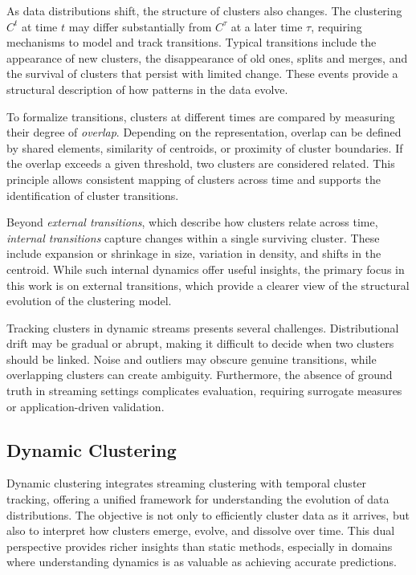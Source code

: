 As data distributions shift, the structure of clusters also changes. The
clustering $C^t$ at time $t$ may differ substantially from $C^\tau$ at a later
time $\tau$, requiring mechanisms to model and track transitions. Typical transitions
include the appearance of new clusters, the disappearance of old ones, splits
and merges, and the survival of clusters that persist with limited change. These
events provide a structural description of how patterns in the data evolve.

To formalize transitions, clusters at different times are compared by measuring
their degree of \emph{overlap}. Depending on the representation, overlap can be defined
by shared elements, similarity of centroids, or proximity of cluster boundaries.
If the overlap exceeds a given threshold, two clusters are considered related.
This principle allows consistent mapping of clusters across time and supports
the identification of cluster transitions.

Beyond \emph{external transitions}, which describe how clusters relate across time,
\emph{internal transitions} capture changes within a single surviving cluster. These
include expansion or shrinkage in size, variation in density, and shifts in the
centroid. While such internal dynamics offer useful insights, the primary focus
in this work is on external transitions, which provide a clearer view of the
structural evolution of the clustering model.

Tracking clusters in dynamic streams presents several challenges. Distributional
drift may be gradual or abrupt, making it difficult to decide when two clusters
should be linked. Noise and outliers may obscure genuine transitions, while
overlapping clusters can create ambiguity. Furthermore, the absence of ground
truth in streaming settings complicates evaluation, requiring surrogate measures
or application-driven validation.

\subsection{Dynamic Clustering}\label{sec:dynamic_clustering}

Dynamic clustering integrates streaming clustering with temporal cluster
tracking, offering a unified framework for understanding the evolution of data
distributions. The objective is not only to efficiently cluster data as it
arrives, but also to interpret how clusters emerge, evolve, and dissolve over
time. This dual perspective provides richer insights than static methods,
especially in domains where understanding dynamics is as valuable as achieving
accurate predictions.

